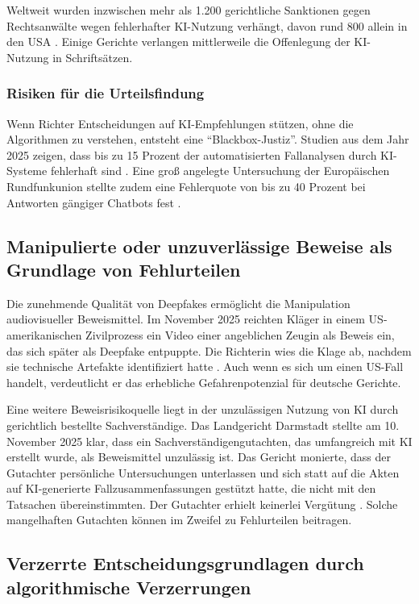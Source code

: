 \documentclass[12pt,a4paper]{article}
\begin{document}
	Weltweit wurden inzwischen mehr als 1.200 gerichtliche Sanktionen gegen Rechtsanwälte wegen fehlerhafter KI-Nutzung verhängt, davon rund 800 allein in den USA \cite{NPR2025}. Einige Gerichte verlangen mittlerweile die Offenlegung der KI-Nutzung in Schriftsätzen.
	
	\subsubsection{Risiken für die Urteilsfindung}
	Wenn Richter Entscheidungen auf KI-Empfehlungen stützen, ohne die Algorithmen zu verstehen, entsteht eine \enquote{Blackbox-Justiz}. Studien aus dem Jahr 2025 zeigen, dass bis zu 15 Prozent der automatisierten Fallanalysen durch KI-Systeme fehlerhaft sind \cite{LTO2025b}. Eine groß angelegte Untersuchung der Europäischen Rundfunkunion stellte zudem eine Fehlerquote von bis zu 40 Prozent bei Antworten gängiger Chatbots fest \cite{heise2025}.
	
	\subsection{Manipulierte oder unzuverlässige Beweise als Grundlage von Fehlurteilen}
	
	Die zunehmende Qualität von Deepfakes ermöglicht die Manipulation audiovisueller Beweismittel. Im November 2025 reichten Kläger in einem US-amerikanischen Zivilprozess ein Video einer angeblichen Zeugin als Beweis ein, das sich später als Deepfake entpuppte. Die Richterin wies die Klage ab, nachdem sie technische Artefakte identifiziert hatte \cite{LTO2025c}. Auch wenn es sich um einen US-Fall handelt, verdeutlicht er das erhebliche Gefahrenpotenzial für deutsche Gerichte.
	
	Eine weitere Beweisrisikoquelle liegt in der unzulässigen Nutzung von KI durch gerichtlich bestellte Sachverständige. Das Landgericht Darmstadt stellte am 10. November 2025 klar, dass ein Sachverständigengutachten, das umfangreich mit KI erstellt wurde, als Beweismittel unzulässig ist. Das Gericht monierte, dass der Gutachter persönliche Untersuchungen unterlassen und sich statt auf die Akten auf KI-generierte Fallzusammenfassungen gestützt hatte, die nicht mit den Tatsachen übereinstimmten. Der Gutachter erhielt keinerlei Vergütung \cite{LG Darmstadt2025}. Solche mangelhaften Gutachten können im Zweifel zu Fehlurteilen beitragen.
	
	\subsection{Verzerrte Entscheidungsgrundlagen durch algorithmische Verzerrungen}
	
\end{document}
